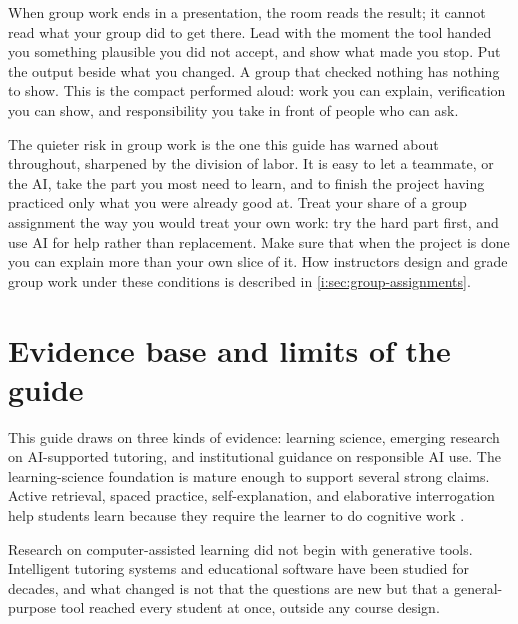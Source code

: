 \documentclass{SIAMbook2023}
\begin{document}
When group work ends in a presentation, the room reads the result; it cannot read what your group did to get there. Lead with the moment the tool handed you something plausible you did not accept, and show what made you stop. Put the output beside what you changed. A group that checked nothing has nothing to show. This is the compact performed aloud: work you can explain, verification you can show, and responsibility you take in front of people who can ask.

The quieter risk in group work is the one this guide has warned about throughout, sharpened by the division of labor. It is easy to let a teammate, or the AI, take the part you most need to learn, and to finish the project having practiced only what you were already good at. Treat your share of a group assignment the way you would treat your own work: try the hard part first, and use AI for help rather than replacement. Make sure that when the project is done you can explain more than your own slice of it. How instructors design and grade group work under these conditions is described in \cref{i:sec:group-assignments}.

\section{Evidence base and limits of the guide}
\label{sec:evidence-limits}%

This guide draws on three kinds of evidence: learning science, emerging research on AI-supported tutoring, and institutional guidance on responsible AI use. The learning-science foundation is mature enough to support several strong claims. Active retrieval, spaced practice, self-explanation, and elaborative interrogation help students learn because they require the learner to do cognitive work \citep{dunlosky2013improving}.

Research on computer-assisted learning did not begin with generative tools. Intelligent tutoring systems and educational software have been studied for decades, and what changed is not that the questions are new but that a general-purpose tool reached every student at once, outside any course design.
\end{document}

